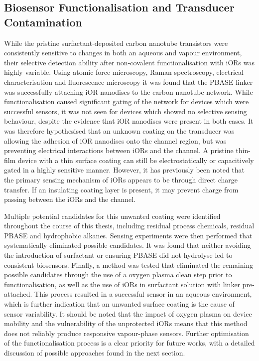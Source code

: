 \documentclass[
  a4paper,
]{scrbook}
\begin{document}
\hypertarget{biosensor-functionalisation-and-transducer-contamination}{%
\subsection{Biosensor Functionalisation and Transducer
Contamination}\label{biosensor-functionalisation-and-transducer-contamination}}

While the pristine surfactant-deposited carbon nanotube transistors were
consistently sensitive to changes in both an aqueous and vapour
environment, their selective detection ability after non-covalent
functionalisation with iORs was highly variable. Using atomic force
microscopy, Raman spectroscopy, electrical characterisation and
fluorescence microscopy it was found that the PBASE linker was
successfully attaching iOR nanodiscs to the carbon nanotube network.
While functionalisation caused significant gating of the network for
devices which were successful sensors, it was not seen for devices which
showed no selective sensing behaviour, despite the evidence that iOR
nanodiscs were present in both cases. It was therefore hypothesised that
an unknown coating on the transducer was allowing the adhesion of iOR
nanodiscs onto the channel region, but was preventing electrical
interactions between iORs and the channel. A pristine thin-film device
with a thin surface coating can still be electrostatically or
capacitively gated in a highly sensitive manner. However, it has
previously been noted that the primary sensing mechanism of iORs appears
to be through direct charge transfer. If an insulating coating layer is
present, it may prevent charge from passing between the iORs and the
channel.

Multiple potential candidates for this unwanted coating were identified
throughout the course of this thesis, including residual process
chemicals, residual PBASE and hydrophobic alkanes. Sensing experiments
were then performed that systematically eliminated possible candidates.
It was found that neither avoiding the introduction of surfactant or
ensuring PBASE did not hydrolyse led to consistent biosensors. Finally,
a method was tested that eliminated the remaining possible candidates
through the use of a oxygen plasma clean step prior to
functionalisation, as well as the use of iORs in surfactant solution
with linker pre-attached. This process resulted in a successful sensor
in an aqueous environment, which is further indication that an unwanted
surface coating is the cause of sensor variability. It should be noted
that the impact of oxygen plasma on device mobility and the
vulnerability of the unprotected iORs means that this method does not
reliably produce responsive vapour-phase sensors. Further optimisation
of the functionalisation process is a clear priority for future works,
with a detailed discussion of possible approaches found in the next
section.
\end{document}
